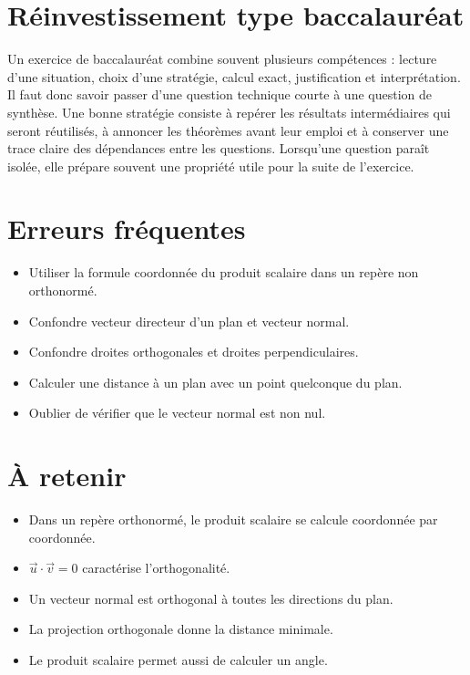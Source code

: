 \section{Réinvestissement type baccalauréat}
Un exercice de baccalauréat combine souvent plusieurs compétences : lecture d'une situation, choix d'une stratégie, calcul exact, justification et interprétation. Il faut donc savoir passer d'une question technique courte à une question de synthèse. Une bonne stratégie consiste à repérer les résultats intermédiaires qui seront réutilisés, à annoncer les théorèmes avant leur emploi et à conserver une trace claire des dépendances entre les questions. Lorsqu'une question paraît isolée, elle prépare souvent une propriété utile pour la suite de l'exercice.

\section{Erreurs fréquentes}
\begin{itemize}
\item Utiliser la formule coordonnée du produit scalaire dans un repère non orthonormé.
\item Confondre vecteur directeur d’un plan et vecteur normal.
\item Confondre droites orthogonales et droites perpendiculaires.
\item Calculer une distance à un plan avec un point quelconque du plan.
\item Oublier de vérifier que le vecteur normal est non nul.
\end{itemize}

\section{À retenir}
\begin{aretenir}
\begin{itemize}
\item Dans un repère orthonormé, le produit scalaire se calcule coordonnée par coordonnée.
\item $\vec u\cdot\vec v=0$ caractérise l’orthogonalité.
\item Un vecteur normal est orthogonal à toutes les directions du plan.
\item La projection orthogonale donne la distance minimale.
\item Le produit scalaire permet aussi de calculer un angle.
\end{itemize}
\end{aretenir}
